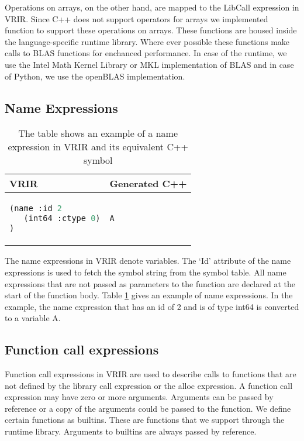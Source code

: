 Operations on arrays, on the other hand, are mapped to the LibCall expression in VRIR. Since C++ does not support operators for arrays we implemented function to support these operations on arrays. These functions are housed inside the language-specific runtime library. Where ever possible these functions make calls to BLAS functions for enchanced performance. In case of the \matlab runtime, we use the Intel Math Kernel Library\cite{mkl} or MKL implementation of BLAS and in case of Python, we use the openBLAS\cite{openblas} implementation.
\subsection{Name Expressions}
\begin{table}[htbp]
\centering
\begin{tabular}{|l|l|}
\hline

VRIR &  Generated C++ \\
\hline
{
\begin{lstlisting}[language=lisp,frame=none, numbers=none]
(name :id 2
   (int64 :ctype 0)
)
\end{lstlisting}
}
&
{
\begin{lstlisting}[language=c,frame=none, numbers=none]
A
\end{lstlisting}
} \\
\hline
\end{tabular}
\caption[Name Expressions example]{The table shows an example of a name expression in VRIR and its equivalent C++ symbol}
\label{tab:nameExpr}
\end{table}
The name expressions in VRIR denote variables. The `Id' attribute of the name expressions is used to fetch the symbol string from the symbol table. All name expressions that are not passed as parameters to the function are declared at the start of the function body. Table \ref{tab:nameExpr} gives an example of name expressions. In the example, the name expression that has an id of 2 and is of type int64 is converted to a variable A.
\subsection{Function call expressions}
Function call expressions in VRIR are used to describe calls to functions that are not defined by  the library call expression or the alloc expression. A function call expression may have zero or more arguments. Arguments can be passed by reference or a copy of the arguments could be passed to the function. We define certain functions as builtins. These are functions that we support through the runtime library. Arguments to builtins are always passed by reference.
